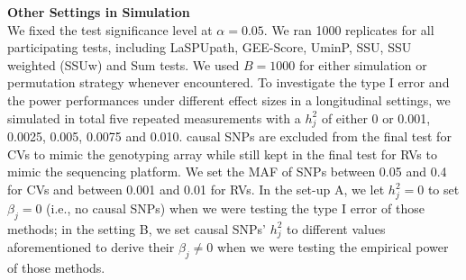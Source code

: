 \documentclass[12pt]{article}
\begin{document}
\textbf{Other Settings in Simulation}\\
We fixed the test significance level at $\alpha = 0.05$. We ran 1000 replicates for all participating tests, including LaSPUpath, GEE-Score, UminP, SSU, SSU weighted (SSUw) and Sum tests. We used $B = 1000$ for either simulation or permutation strategy whenever encountered. To investigate the type I error and the power performances under different effect sizes in a longitudinal settings, we simulated in total five repeated measurements with a $h_j^2$ of either 0 or 0.001, 0.0025, 0.005, 0.0075 and 0.010. causal SNPs are excluded from the final test for CVs to mimic the genotyping array while still kept in the final test for RVs to mimic the sequencing platform. We set the MAF of SNPs between 0.05 and 0.4 for CVs and between 0.001 and 0.01 for RVs. In the set-up A, we let $h_j^2 = 0$ to set $\beta_j = 0$ (i.e., no causal SNPs) when we were testing the type I error of those methods; in the setting B, we set causal SNPs' $h_j^2$ to different values aforementioned to derive their $\beta_j \neq 0$ when we were testing the empirical power of those methods. 


\end{document}
